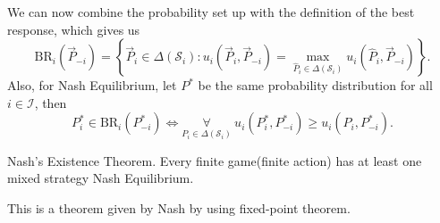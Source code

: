 We can now combine the probability set up with the definition of the best response, which gives us
\[
	\mathrm{BR}_{i}(\overrightarrow{P}_{-i}) = \left\{\overrightarrow{P}_i\in \Delta(\mathcal{S}_i)\colon u_{i}(\overrightarrow{P}_i, \overrightarrow{P}_{-i}) = \max_{\hat{P}_i\in \Delta(\mathcal{S}_i)}u_{i}(\hat{P}_i, \overrightarrow{P}_{-i})\right\}.
\]
Also, for Nash Equilibrium, let \(P^{*}\) be the same probability distribution for all \(i\in \mathcal{I} \), then
\[
	P^{*}_i\in\mathrm{BR}_i(P^{*}_{-i})\iff \underset{P_{i}\in \Delta(\mathcal{S}_i)}{\forall }\ u_{i}(P^{*}_i, P^{*}_{-i})\geq u_{i}(P_{i}, P^{*}_{-i}).
\]

\begin{theorem}
	Nash's Existence Theorem. Every finite game(finite action) has at least one mixed strategy Nash Equilibrium.
\end{theorem}
\begin{remark}
	This is a theorem given by Nash by using fixed-point theorem.
\end{remark}